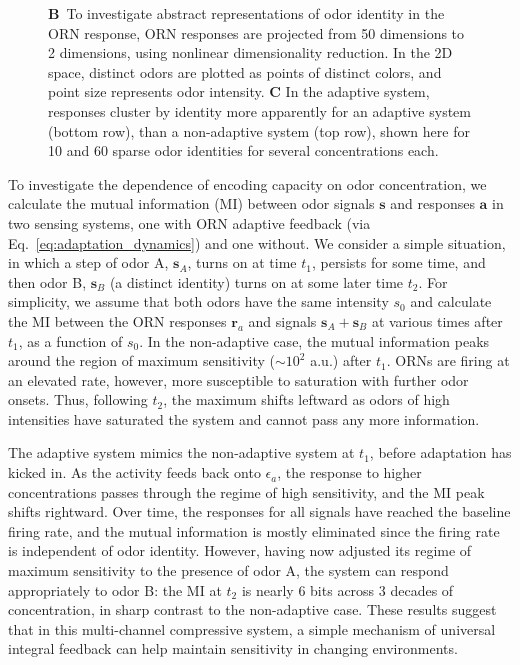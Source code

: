 \begin{figure}[!tb]
{{        \textbf{B}~To investigate abstract representations of odor identity in the ORN response, ORN responses are projected from 50 dimensions to 2 dimensions, using nonlinear dimensionality reduction. In the 2D space, distinct odors are plotted as points of distinct colors, and point size represents odor intensity. 
        \textbf{C} In the adaptive system, responses cluster by identity more apparently for an adaptive system (bottom row), than a non-adaptive system (top row), shown here for 10 and 60 sparse odor identities for several concentrations each.}} %
	\label{fig:coding}
\end{figure}

To investigate the dependence of encoding capacity on odor concentration, we calculate the mutual information (MI) between odor signals $\mathbf s$ and responses $\mathbf a$ in two sensing systems, one with ORN adaptive feedback (via Eq.~\ref{eq:adaptation_dynamics}) and one without. We consider a simple situation, in which a step of odor A, $\textbf{s}_A$,  turns on at time $t_1$, persists for some time, and then odor B, $\mathbf s_B$ (a distinct identity) turns on at some later time $t_2$. For simplicity, we assume that both odors have the same intensity $s_0$ and calculate the MI between the ORN responses $\mathbf {r}_a$ and signals $\mathbf s_A + \mathbf s_B$ at various times after $t_1$, as a function of $s_0$. In the non-adaptive case, the mutual information peaks around the region of maximum sensitivity ($\sim 10^2$ a.u.) after $t_1$. ORNs are firing at an elevated rate, however, more susceptible to saturation with further odor onsets. Thus, following $t_2$, the maximum shifts leftward as odors of high intensities have saturated the system and cannot pass any more information.

The adaptive system mimics the non-adaptive system at $t_1$,  before adaptation has kicked in. As the activity feeds back onto $\epsilon_a$, the response to higher concentrations passes through the regime of high sensitivity, and the MI peak shifts rightward. Over time, the responses for all signals have reached the baseline firing rate, and the mutual information is mostly eliminated since the firing rate is independent of odor identity. However, having now adjusted its regime of maximum sensitivity to the presence of odor A, the system can respond appropriately to odor B: the MI at $t_2$ is nearly 6 bits across 3 decades of concentration, in sharp contrast to the non-adaptive case. These results suggest that in this multi-channel compressive system, a simple mechanism of universal integral feedback can help maintain sensitivity in changing environments.

